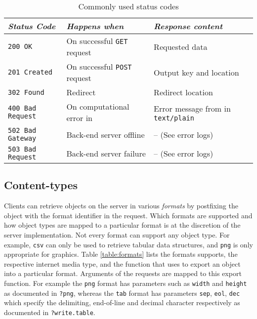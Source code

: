 \begin{table}[H]
\centering
\def\arraystretch{1.3}%
\begin{tabular}{@{}lll@{}}
\toprule
\emph{Status Code}              & \emph{Happens when}                             & \emph{Response content}                     \\ \midrule
\texttt{200 OK}          & On successful \texttt{GET} request                     & Requested data                    \\
\texttt{201 Created}     & On successful \texttt{POST} request                    & Output key and location                     \\
\texttt{302 Found}       & Redirect                                               & Redirect location                   \\
\texttt{400 Bad Request} & On computational error in \R                                     & Error message from \R in \texttt{text/plain} \\
\texttt{502 Bad Gateway} & Back-end server offline                            & -- (See error logs) \\
\texttt{503 Bad Request} & Back-end server failure                                & -- (See error logs) \\ \bottomrule                          
\end{tabular}
\caption{Commonly used \HTTP status codes}
\label{table:statuscodes}
\end{table}

\subsection{Content-types}

Clients can retrieve objects on the server in various \emph{formats} by postfixing the object \URL with the format identifier in the \GET request. Which formats are supported and how object types are mapped to a particular format is at the discretion of the server implementation. Not every format can support any object type. For example, \texttt{csv} can only be used to retrieve tabular data structures, and \texttt{png} is only appropriate for graphics. Table \ref{table:formats} lists the formats \OpenCPU supports, the respective internet media type, and the \R function that \OpenCPU uses to export an object into a particular format. Arguments of the \GET requests are mapped to this export function. For example the \texttt{png} format has parameters such as \texttt{width} and \texttt{height} as documented in \texttt{?png}, whereas the \texttt{tab} format has parameters \texttt{sep}, \texttt{eol}, \texttt{dec} which specify the delimiting, end-of-line and decimal character respectively as documented in \texttt{?write.table}.

